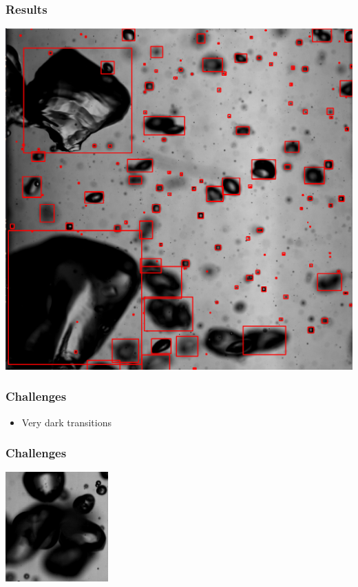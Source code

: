 \documentclass{beamer}
\begin{document}
\begin{frame}
    \frametitle{Results}
    \begin{center}
        \includegraphics[width=0.8\columnwidth]{bubble-detection-2}
    \end{center}
\end{frame}

\begin{frame}
    \frametitle{Challenges}
    \begin{itemize}
        \item Very dark transitions
    \end{itemize}
\end{frame}

\begin{frame}
    \frametitle{Challenges}
    \begin{center}
        \includegraphics[width=0.8\columnwidth]{dark-transition}
    \end{center}
\end{frame}
\end{document}
